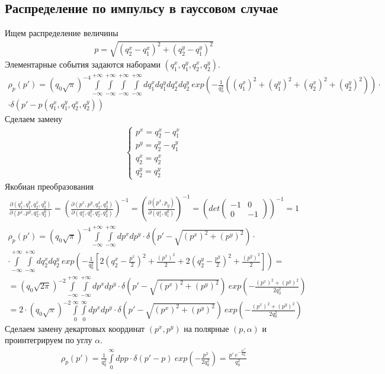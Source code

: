 \documentclass[12pt]{article}
\renewcommand{\l}{\left( }
\renewcommand{\r}{\right) }
\newcommand{\pd}{\partial}
\newcommand{\br}[1]{\l {#1} \r}
\newcommand{\rint}{\int\limits_{-\infty}^{+\infty}}
\newcommand{\jacobian}[2]{\frac{\pd \br{#1}}{\pd \br{#2}}}
\begin{document}
\subsection{Распределение по импульсу в гауссовом случае}
Ищем распределение величины
\begin{eqnarray}
p = \sqrt{\br{q_2^x - q_1^x}^2 + \br{q_2^y - q_1^y}^2}
\end{eqnarray}
Элементарные события задаются наборами $\br{q_1^x, q_1^y, q_2^x, q_2^y}$.
\begin{eqnarray}
\rho_p \br{p'} = \br{q_0 \sqrt\pi}^{-4} \rint\rint\rint\rint dq_1^x dq_1^y dq_2^x dq_2^y  \ exp \br{-\frac{1}{q_0^2} \br{\br{q_1^x}^2 + \br{q_1^y}^2 + \br{q_2^x}^2 + \br{q_2^y}^2}} \cdot \nonumber \\
\cdot \delta \br{p' - p\br{q_1^x, q_1^y, q_2^x, q_2^y}}
\end{eqnarray}
Сделаем замену
\begin{eqnarray}
\begin{cases}
p^x = q_2^x - q_1^x \\
p^y = q_2^y - q_1^y \\
q_2^x = q_2^x \\
q_2^y = q_2^y
\end{cases}
\end{eqnarray}
Якобиан преобразования
\begin{eqnarray}
\jacobian{q_1^x, q_1^y, q_2^x, q_2^y}{p^x, p^y, q_2^x, q_2^y} = \br{\jacobian{p^x, p^y, q_2^x, q_2^y}{q_1^x, q_1^y, q_2^x, q_2^y}}^{-1} = \br{\jacobian{p^x, p_y}{q_1^x, q_1^y}}^{-1} = \br{ det
\begin{pmatrix}
-1 & 0 \\
0 & -1
\end{pmatrix}
}^{-1} = 1
\end{eqnarray}
\begin{eqnarray}
\rho_p \br{p'} = \br{q_0 \sqrt\pi}^{-4} \rint \rint dp^x dp^y \cdot \delta \br{p' - \sqrt{\br{p^x}^2 + \br{p^y}^2}} \cdot \nonumber \\
\cdot \rint \rint dq_2^x dq_2^y \ exp \br{-\frac{1}{q_0^2} \left[ 2 \br{q_2^x - \frac{p^x}{2}}^2 + \frac{\br{p^x}^2}{2} + 2 \br{q_2^y - \frac{p^y}{2}}^2 + \frac{\br{p^y}^2}{2} \right]} = \nonumber \\
= \br{q_0 \sqrt{2\pi}}^{-2} \rint \rint dp^x dp^y \cdot \delta \br{p' - \sqrt{\br{p^x}^2 + \br{p^y}^2}} \ exp \br{-\frac{\br{p^x}^2 + \br{p^y}^2}{2q_0^2}} \nonumber \\
= 2 \cdot \br{q_0 \sqrt{\pi}}^{-2} \int\limits_0^\infty \int\limits_0^\infty dp^x dp^y \cdot \delta \br{p' - \sqrt{\br{p^x}^2 + \br{p^y}^2}} \ exp \br{-\frac{\br{p^x}^2 + \br{p^y}^2}{2q_0^2}}\end{eqnarray}
Сделаем замену декартовых координат $\br{p^x, p^y}$ на полярные $\br{p, \alpha}$ и проинтегрируем по углу $\alpha$.
\begin{eqnarray}
\rho_p \br{p'} = \frac{1}{q_0^2} \int\limits_0^\infty dp p \cdot \delta \br{p' - p} \ exp \br{-\frac{p^2}{2q_0^2}} = \frac{p' \ e^{-\frac{p'^2}{2q_0^2}}}{q_0^2}
\end{eqnarray}
\end{document}
